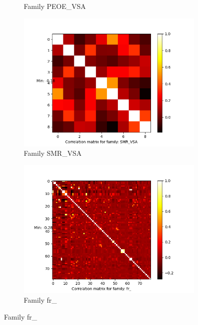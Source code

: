 \documentclass[11pt]{article}
\begin{document}
\begin{figure}
\begin{subfigure}[b]{0.45\textwidth}
        \caption{Family PEOE\_VSA}
        \label{fig:correlationPEOEVSA}
     \end{subfigure}
          \hfill
     \begin{subfigure}[b]{0.45\textwidth}
         \centering
        \includegraphics[scale=0.5]{images/correlationSMRVSA}
        \caption{Family SMR\_VSA}
        \label{fig:correlationSMRVSA}
     \end{subfigure}
               \hfill
     \begin{subfigure}[b]{0.45\textwidth}
         \centering
        \includegraphics[scale=0.5]{images/correlationfr}
        \caption{Family fr\_}
        \label{fig:correlationfr}
     \end{subfigure}

\end{figure}
\end{document}
